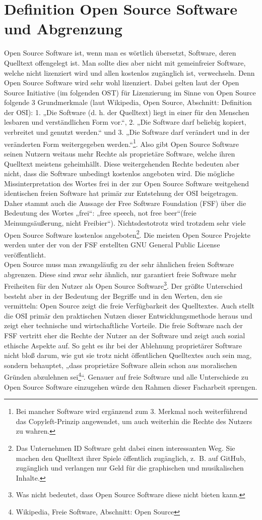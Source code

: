 \documentclass[a4paper,12pt]{article}
\begin{document}
\section{Definition Open Source Software und Abgrenzung}
Open Source Software ist, wenn man es wörtlich übersetzt, Software, deren Quelltext offengelegt ist. Man sollte dies aber nicht mit gemeinfreier Software, welche nicht lizenziert wird und allen kostenlos zugänglich ist, verwechseln. Denn Open Source Software wird sehr wohl lizenziert. Dabei gelten laut der Open Source Initiative (im folgenden OST) für Lizenzierung im Sinne von Open Source folgende 3 Grundmerkmale (laut Wikipedia, Open Source, Abschnitt: Definition der OSI): 1. „Die Software (d. h. der Quelltext) liegt in einer für den Menschen lesbaren und verständlichen Form vor.“, 2. „Die Software darf beliebig kopiert, verbreitet und genutzt werden.“ und 3. „Die Software darf verändert und in der veränderten Form weitergegeben werden.“\footnote{Bei mancher Software wird ergänzend zum 3. Merkmal noch weiterführend das Copyleft-Prinzip angewendet, um auch weiterhin die Rechte des Nutzers zu wahren.}. Also gibt Open Source Software seinen Nutzern weitaus mehr Rechte als proprietäre Software, welche ihren Quelltext meistens geheimhällt. Diese weitergehenden Rechte bedeuten aber nicht, dass die Software unbedingt kostenlos angeboten wird. Die mögliche Missinterpretation des Wortes frei in der zur Open Source Software weitgehend identischen freien Software hat primär zur Entstehung der OSI beigetragen. Daher stammt auch die Aussage der Free Software Foundation (FSF) über die Bedeutung des Wortes „frei“: „free speech, not free beer“(freie Meinungsäußerung, nicht Freibier“). Nichtsdestotrotz wird trotzdem sehr viele Open Source Software kostenlos angeboten\footnote{Das Unternehmen ID Software geht dabei einen interessanten Weg. Sie machen den Quelltext ihrer Spiele öffentlich zugänglich, z.~B. auf GitHub, zugänglich und verlangen nur Geld für die graphischen und musikalischen Inhalte.}. Die meisten Open Source Projekte werden unter der von der FSF erstellten GNU General Public License veröffentlicht.\\
Open Source muss man zwangsläufig zu der sehr ähnlichen freien Software abgrenzen. Diese sind zwar sehr ähnlich, nur garantiert freie Software mehr Freiheiten für den Nutzer als Open Source Software\footnote{Was nicht bedeutet, dass Open Source Software diese nicht bieten kann.}. Der größte Unterschied besteht aber in der Bedeutung der Begriffe und in den Werten, den sie vermitteln: Open Source zeigt die freie Verfügbarkeit des Quelltextes. Auch stellt die OSI primär den praktischen Nutzen dieser Entwicklungsmethode heraus und zeigt eher technische und wirtschaftliche Vorteile. Die freie Software nach der FSF vertritt eher die Rechte der Nutzer an der Software und zeigt auch sozial ethische Aspekte auf. So geht es ihr bei der Ablehnung proprietärer Software nicht bloß darum, wie gut sie trotz nicht öffentlichen Quelltextes auch sein mag, sondern behauptet, „dass proprietäre Software allein schon aus moralischen Gründen abzulehnen sei\footnote{Wikipedia, Freie Software, Abschnitt: Open Source}“. Genauer auf freie Software und alle Unterschiede zu Open Source Software einzugehen würde den Rahmen dieser Facharbeit sprengen.
\end{document}

